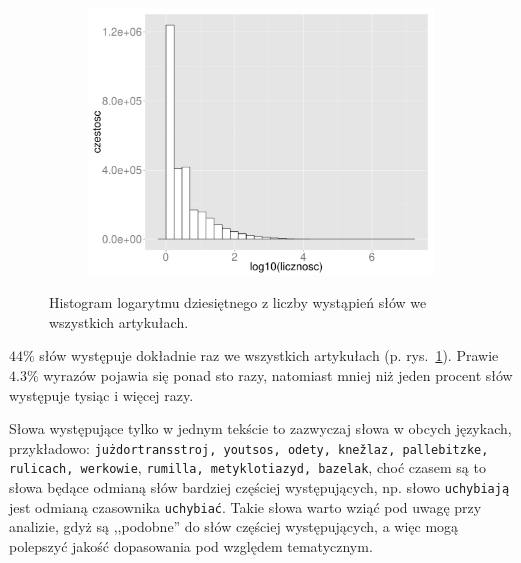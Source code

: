 \documentclass{praca1}
\begin{document}
\begin{figure}[!h]
  \centering
  \includegraphics[width=350pt, height=200pt]{plot2.pdf}\\
  \caption{Histogram logarytmu dziesiętnego z liczby wystąpień słów we wszystkich artykułach.}\label{plot:002}
\end{figure}

$44\%$ słów występuje dokładnie raz we wszystkich artykułach (p. rys.~\ref{plot:002}). Prawie $4.3\%$ wyrazów pojawia się ponad sto razy, natomiast mniej niż jeden procent słów występuje tysiąc i więcej razy.

Słowa występujące tylko w jednym tekście to zazwyczaj słowa w obcych językach, przykładowo: \verb|jużdortransstroj, youtsos, odety, knežlaz, pallebitzke, rulicach, werkowie|, \verb|rumilla, metyklotiazyd, bazelak|,
choć czasem są to słowa będące odmianą słów bardziej częściej występujących, np. słowo \verb|uchybiają| jest odmianą czasownika \verb|uchybiać|. Takie słowa warto wziąć pod uwagę przy analizie, gdyż są ,,podobne'' do słów częściej występujących, a więc mogą polepszyć jakość dopasowania pod względem tematycznym.
\end{document}

